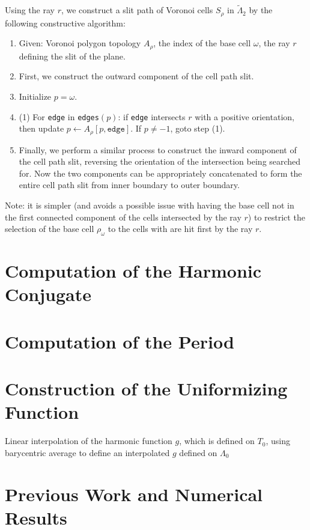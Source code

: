 \documentclass{article}
\begin{document}
Using the ray $r$, we construct a slit path of Voronoi cells $S_\rho$ in $\tilde{\Lambda}_2$ by the following constructive algorithm:
\begin{enumerate}
	\item Given: Voronoi polygon topology $A_\rho$, the index of the base cell $\omega$, the ray $r$ defining the slit of the plane.
	\item First, we construct the outward component of the cell path slit.
	\item Initialize $p = \omega$.
	\item (1) For \texttt{edge} in \texttt{edges}$(p)$:
	if \texttt{edge} intersects $r$ with a positive orientation, then update $p \leftarrow A_\rho[p, \texttt{edge}]$. If $p \ne -1$, goto step (1).
	\item Finally, we perform a similar process to construct the inward component of the cell path slit, reversing the orientation of the intersection being searched for. Now the two components can be appropriately concatenated to form the entire cell path slit from inner boundary to outer boundary.
\end{enumerate}

Note: it is simpler (and avoids a possible issue with having the base cell not in the first connected component of the cells intersected by the ray $r$) to restrict the selection of the base cell $\rho_\omega$ to the cells with are hit first by the ray $r$.

\section{Computation of the Harmonic Conjugate}

\section{Computation of the Period}

\section{Construction of the Uniformizing Function}

Linear interpolation of the harmonic function $g$, which is defined on $T_0$, using barycentric average to define an interpolated $g$ defined on $\Lambda_0$

\section{Previous Work and Numerical Results}
\end{document}
